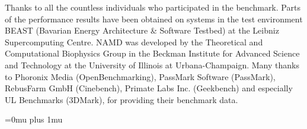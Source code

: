 \documentclass[
]{ceurart}
\begin{document}







\begin{acknowledgments}
Thanks to all the countless individuals who participated in the benchmark. Parts of the performance results have been obtained on systems in the test environment BEAST (Bavarian Energy Architecture \& Software Testbed) at the Leibniz Supercomputing Centre. NAMD was developed by the Theoretical and Computational Biophysics Group in the Beckman Institute for Advanced Science and Technology at the University of Illinois at Urbana-Champaign.
Many thanks to Phoronix Media (OpenBenchmarking), PassMark Software (PassMark), RebusFarm GmbH (Cinebench), Primate Labs Inc. (Geekbench) and especially UL Benchmarks (3DMark), for providing their benchmark data.
\end{acknowledgments}

\Urlmuskip=0mu plus 1mu\relax

\end{document}
